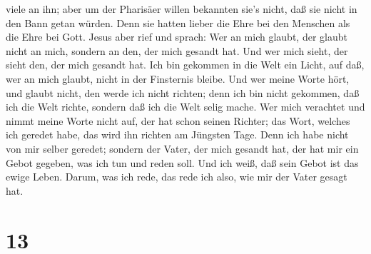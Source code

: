 viele an ihn; aber um der Pharisäer willen bekannten sie's nicht, daß
sie nicht in den Bann getan würden.  Denn sie hatten lieber
die Ehre bei den Menschen als die Ehre bei Gott.  Jesus
aber rief und sprach: Wer an mich glaubt, der glaubt nicht an mich,
sondern an den, der mich gesandt hat.  Und wer mich sieht,
der sieht den, der mich gesandt hat.  Ich bin gekommen in
die Welt ein Licht, auf daß, wer an mich glaubt, nicht in der Finsternis
bleibe.  Und wer meine Worte hört, und glaubt nicht, den
werde ich nicht richten; denn ich bin nicht gekommen, daß ich die Welt
richte, sondern daß ich die Welt selig mache.  Wer mich
verachtet und nimmt meine Worte nicht auf, der hat schon seinen Richter;
das Wort, welches ich geredet habe, das wird ihn richten am Jüngsten
Tage.  Denn ich habe nicht von mir selber geredet; sondern
der Vater, der mich gesandt hat, der hat mir ein Gebot gegeben, was ich
tun und reden soll.  Und ich weiß, daß sein Gebot ist das
ewige Leben. Darum, was ich rede, das rede ich also, wie mir der Vater
gesagt hat.

\hypertarget{section-12}{%
\section{13}\label{section-12}}

